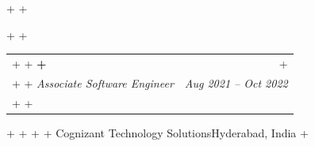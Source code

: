 \documentclass[letterpaper,10pt]{article}                                                                                                                                                                                                                                                                                                                                                                                                                                                                                                                                                                         +
\makeatletter
\newcommand{\resumeSubheading}[4]{                                                                                                                                                                                                                                                                                                                                                                                                                                                                                                                                                                                +
                                                                                                                                                                                                                                                                                                                                                                                                                                                                                                                                                                                                                   +
   \vspace{-2pt}\item                                                                                                                                                                                                                                                                                                                                                                                                                                                                                                                                                                                              +
                                                                                                                                                                                                                                                                                                                                                                                                                                                                                                                                                                                                                   +
     \begin{tabular*}{0.97\textwidth}[t]{l@{\extracolsep{\fill}}r}                                                                                                                                                                                                                                                                                                                                                                                                                                                                                                                                                 +
                                                                                                                                                                                                                                                                                                                                                                                                                                                                                                                                                                                                                   +
       \textbf{#1} & #2 \\                                                                                                                                                                                                                                                                                                                                                                                                                                                                                                                                                                                         +
                                                                                                                                                                                                                                                                                                                                                                                                                                                                                                                                                                                                                   +
       \textit{\small#3} & \textit{\small #4} \\                                                                                                                                                                                                                                                                                                                                                                                                                                                                                                                                                                   +
                                                                                                                                                                                                                                                                                                                                                                                                                                                                                                                                                                                                                   +
     \end{tabular*}\vspace{-6pt}                                                                                                                                                                                                                                                                                                                                                                                                                                                                                                                                                                                   +
                                                                                                                                                                                                                                                                                                                                                                                                                                                                                                                                                                                                                   +
 }                                                                                                                                                                                                                                                                                                                                                                                                                                                                                                                                                                                                                 +
\makeatother
\begin{document}
 \resumeSubheading                                                                                                                                                                                                                                                                                                                                                                                                                                                                                                                                                                                                 +
                                                                                                                                                                                                                                                                                                                                                                                                                                                                                                                                                                                                                   +
   {Associate Software Engineer}{Aug 2021 -- Oct 2022}                                                                                                                                                                                                                                                                                                                                                                                                                                                                                                                                                             +
                                                                                                                                                                                                                                                                                                                                                                                                                                                                                                                                                                                                                   +
   {Cognizant Technology Solutions}{Hyderabad, India}                                                                                                                                                                                                                                                                                                                                                                                                                                                                                                                                                              +
\end{document}
